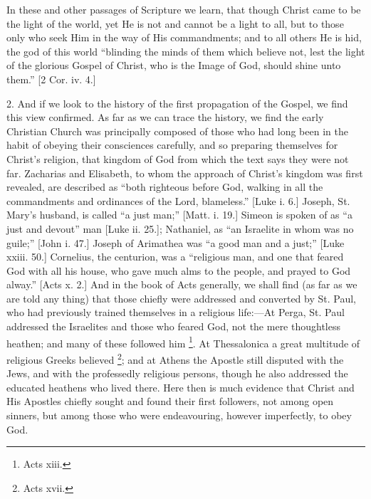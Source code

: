In these and other passages of Scripture we learn, that though
Christ came to be the light of the world, yet He is not and cannot be
a light to all, but to those only who seek Him in the way of His
commandments; and to all others He is hid, the god of this world
``blinding the minds of them which believe not, lest the light of
the glorious Gospel of Christ, who is the Image of God, should shine
unto them.'' [2 Cor. iv. 4.]

2. And if we look to the history of the first propagation of the
Gospel, we find this view confirmed. As far as we can trace the
history, we find the early Christian Church was principally composed
of those who had long been in the habit of obeying their consciences
carefully, and so preparing themselves for Christ's religion, that
kingdom of God from which the text says they were not far. Zacharias
and Elisabeth, to whom the approach of Christ's kingdom was first
revealed, are described as ``both righteous before God, walking in
all the commandments and ordinances of the Lord, blameless.''
[Luke i. 6.] Joseph, St. Mary's husband, is called ``a just
man;'' [Matt. i. 19.] Simeon is spoken of as ``a just and
devout'' man [Luke ii. 25.]; Nathaniel, as ``an Israelite in
whom was no guile;'' [John i. 47.] Joseph of Arimathea was ``a
good man and a just;'' [Luke xxiii. 50.] Cornelius, the centurion,
was a ``religious man, and one that feared God with all his house,
who gave much alms to the people, and prayed to God alway.'' [Acts
x. 2.] And in the book of Acts generally, we shall find (as far as we
are told any thing) that those chiefly were addressed and converted by
St. Paul, who had previously trained themselves in a religious life:—At
Perga, St. Paul addressed the Israelites and those who feared God, not
the mere thoughtless heathen; and many of these followed him \footnote{Acts xiii.}. At Thessalonica a great multitude of religious Greeks believed
\footnote{Acts xvii.}; and at Athens the Apostle still disputed with the Jews,
and with the professedly religious persons, though he also addressed
the educated heathens who lived there. Here then is much evidence that
Christ and His Apostles chiefly sought and found their first
followers, not among open sinners, but among those who were
endeavouring, however imperfectly, to obey God.

